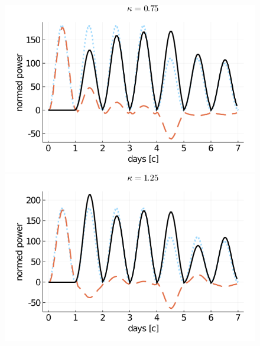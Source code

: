 \begin{figure}[!tbp]
	\centering
	\begin{minipage}[b]{0.475\textwidth}
		\includegraphics[width=\textwidth]{pictures/plots/manual_calc_variation_kappa/kappa_075_energies_sum.png}
		
	\end{minipage}
	\hfill
	\begin{minipage}[b]{0.475\textwidth}
		\includegraphics[width=\textwidth]{pictures/plots/manual_calc_variation_kappa/kappa_125_energies_sum.png}
		
	\end{minipage}
\end{figure}
